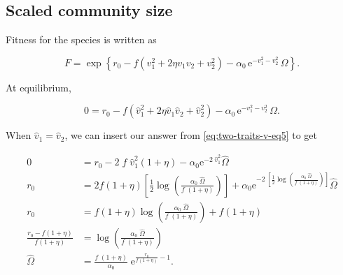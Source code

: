 







\subsection*{Scaled community size}

Fitness for the species is written as

$$
    F = \exp \left\{
        r_0 - f ( {v}_{1}^2 + 2 \eta {v}_{1} {v}_{2} + {v}_{2}^2 ) -
        \alpha_0 \, \textrm{e}^{ - {v}_{1}^2 - {v}_{2}^2 } \, \Omega
    \right\}
    \textrm{.}
$$


\noindent At equilibrium,

\begin{equation}
    0 = r_0 - f ( \hat{v}_{1}^2 + 2 \eta \hat{v}_{1} \hat{v}_{2} + \hat{v}_{2}^2 ) -
        \alpha_0 \, \textrm{e}^{ - {v}_{1}^2 - {v}_{2}^2 } \, \Omega
    \textrm{.}
\label{eq:two-traits-omega-equil-start}
\end{equation}


\noindent When $\hat{v}_1 = \hat{v}_2$, we can insert our answer from
\ref{eq:two-traits-v-eq5} to get

\begin{equation*}
\begin{split}
    0 &= r_0 - 2 \; f \; \hat{v}_{1}^2 ( 1 + \eta ) -
        \alpha_0 \textrm{e}^{ -2 \; \hat{v}_{1}^2 } \hat{\Omega} \\
    r_0 &= 2 f ( 1 + \eta ) \left[
        \frac{1}{2}
        \log \left( \frac{ \alpha_0 \; \hat{\Omega} }{ f \; ( 1 + \eta ) } \right)
    \right] +
        \alpha_0 \textrm{e}^{ -2 \;
            \left[
                \frac{1}{2} \log \left(
                    \frac{ \alpha_0 \; \hat{\Omega} }{ f \; ( 1 + \eta ) }
                \right)
            \right]
        } \hat{\Omega} \\
    r_0 &= f ( 1 + \eta ) \log \left(
        \frac{ \alpha_0 \; \hat{\Omega} }{ f \; ( 1 + \eta ) }
    \right) + f ( 1 + \eta ) \\
    \frac{  r_0 - f ( 1 + \eta ) }{ f ( 1 + \eta ) } &=
        \log \left(
        \frac{ \alpha_0 \; \hat{\Omega} }{ f \; ( 1 + \eta ) }
        \right) \\
    \hat{\Omega} &= \frac{ f \; ( 1 + \eta ) }{ \alpha_0 } \;
        \textrm{e}^{\frac{  r_0 }{ f ( 1 + \eta ) } - 1 }
    \textrm{.}
\end{split}
\end{equation*}

